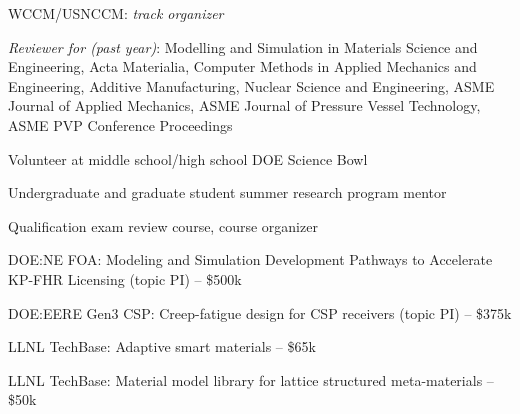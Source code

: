 WCCM/USNCCM:  \emph{track organizer} 

\emph{Reviewer for (past year)}:   
Modelling and Simulation in Materials Science and Engineering,
Acta Materialia,
Computer Methods in Applied Mechanics and Engineering,
Additive Manufacturing,
Nuclear Science and Engineering,
ASME Journal of Applied Mechanics,
ASME Journal of Pressure Vessel Technology,
ASME PVP Conference Proceedings 


Volunteer at middle school/high school DOE Science Bowl 

Undergraduate and graduate student summer research program mentor 

Qualification exam review course, course organizer 


DOE:NE FOA: Modeling and Simulation Development Pathways to Accelerate KP-FHR Licensing (topic PI) -- \$500k 

DOE:EERE Gen3 CSP: Creep-fatigue design for CSP receivers (topic PI) -- \$375k 

LLNL TechBase: Adaptive smart materials -- \$65k 

LLNL TechBase: Material model library for lattice structured meta-materials
-- \$50k 

\extra


\nocite{*}


\printbibliography[keyword=refereed,heading=none]


\printbibliography[keyword=pending,heading=none]


\printbibliography[keyword=conf,heading=none]


\printbibliography[keyword=patents,heading=none]


\printbibliography[keyword=nonref,heading=none]


\printbibliography[keyword=invited,heading=none]



